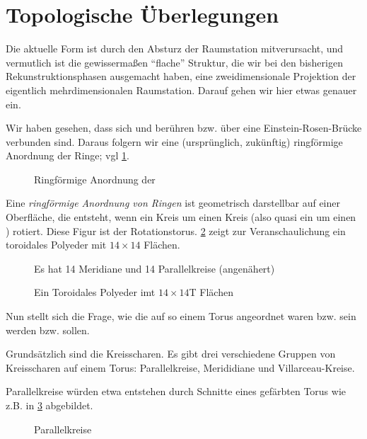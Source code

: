 \section*{Topologische Überlegungen}\label{sec:topologie}

Die aktuelle Form ist durch den Absturz der Raumstation mitverursacht, und vermutlich ist die gewissermaßen "`flache"' Struktur, die wir bei den bisherigen Rekunstruktionsphasen ausgemacht haben, eine zweidimensionale Projektion der eigentlich mehrdimensionalen Raumstation. Darauf gehen wir hier etwas genauer ein.

Wir haben gesehen, dass sich  und  berühren bzw. über eine Einstein-Rosen-Brücke verbunden sind. Daraus folgern wir eine (ursprünglich, zukünftig) ringförmige Anordnung der Ringe; vgl  \cref{fig:ringring}.

\begin{figure}[ht!]
    \centering
    
    \caption{Ringförmige Anordnung der }
    \label{fig:ringring}
\end{figure}

Eine \emph{ringförmige Anordnung von Ringen }ist geometrisch darstellbar auf einer Oberfläche, die entsteht, wenn ein Kreis um einen Kreis (also quasi ein  um einen ) rotiert. Diese Figur ist der Rotationstorus. \cref{fig:torusweiss}  zeigt zur Veranschaulichung ein toroidales Polyeder mit $14\times 14$ Flächen.  

\begin{figure}[ht!]
    \centering
    
    \caption{Ein Toroidales Polyeder imt $14\times 14$T Flächen} Es hat 14  Meridiane und 14 Parallelkreise (angenähert)
    \label{fig:torusweiss}
\end{figure}

Nun stellt sich die Frage, wie die  auf so einem Torus angeordnet waren bzw. sein werden bzw. sollen. 

Grundsätzlich sind die  Kreisscharen. Es gibt drei verschiedene Gruppen von Kreisscharen auf einem Torus: Parallelkreise, Merididiane und Villarceau-Kreise. 

Parallelkreise würden etwa entstehen durch Schnitte eines gefärbten Torus wie z.B. in \cref{fig:torus-parallele} abgebildet. 

\begin{figure}[ht!]
    \centering
    
    \caption{Parallelkreise}
    \label{fig:torus-parallele}
\end{figure}

